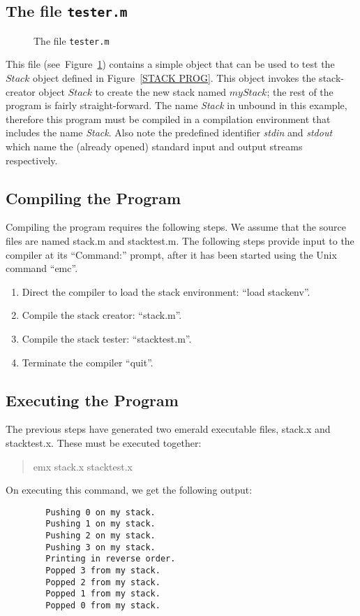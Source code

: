 \subsection*{The file {\tt tester.m}}
\begin{figure}

\caption{The file {\tt tester.m}}
\label{TEST STACK PROG}
\end{figure}
This file (see~Figure~\ref{TEST STACK PROG}) contains a simple object that
can be used to
test the $Stack$ object defined in Figure~\ref{STACK PROG}.
This object invokes the stack-creator object $Stack$
to create the new stack named $myStack$; the rest of the program is fairly
straight-forward. The name {\it Stack\/} in unbound in this example,
therefore this program must be compiled in a compilation environment that
includes the name {\it Stack\/}.
Also note the predefined identifier {\it stdin\/} and {\it stdout\/} which name
the (already opened) standard input and output streams respectively.

\subsection{Compiling the Program}
\label{compiling program}
Compiling the program requires the following steps.  We assume that the
source files are named stack.m and stacktest.m.  The following steps provide
input to the compiler at its ``Command:'' prompt, after it has been started
using the Unix command ``emc''.
\begin{enumerate}
  \item{} Direct the compiler to load the stack environment:  ``load
    stackenv''.
  \item{} Compile the stack creator: ``stack.m''.
  \item{} Compile the stack tester: ``stacktest.m''.
  \item{} Terminate the compiler ``quit''.
\end{enumerate}
\subsection{Executing the Program}
\label{executing program}
The previous steps have generated two emerald executable files, stack.x and
stacktest.x.  These must be executed together:
\begin{quote}
  emx stack.x stacktest.x
\end{quote}

On executing this command, we get the following output:

\begin{verbatim}
        Pushing 0 on my stack.
        Pushing 1 on my stack.
        Pushing 2 on my stack.
        Pushing 3 on my stack.
        Printing in reverse order.
        Popped 3 from my stack.
        Popped 2 from my stack.
        Popped 1 from my stack.
        Popped 0 from my stack.
\end{verbatim}
